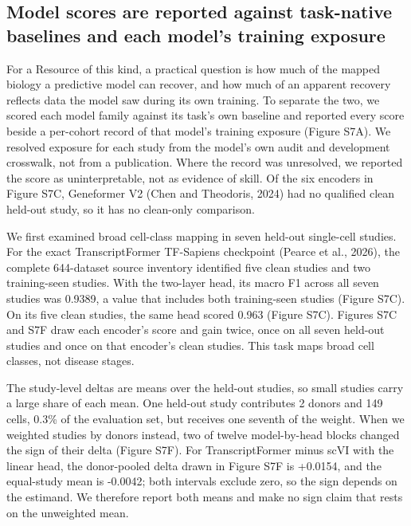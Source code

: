 \subsection{Model scores are reported against task-native baselines and each model's training exposure}\label{model-scores-are-reported-against-task-native-baselines-and-each-models-training-exposure}

For a Resource of this kind, a practical question is how much of the mapped
biology a predictive model can recover, and how much of an apparent recovery
reflects data the model saw during its own training. To separate the two, we
scored each model family against its task's own baseline and reported every
score beside a per-cohort record of that model's training exposure (Figure S7A).
We resolved exposure for each study from the model's own audit and development
crosswalk, not from a publication. Where the record was unresolved, we reported
the score as uninterpretable, not as evidence of skill. Of the six
encoders in Figure S7C, Geneformer V2 (Chen and Theodoris, 2024) had no qualified
clean held-out study, so it has no clean-only comparison.

We first examined broad cell-class mapping in seven held-out single-cell
studies. For the exact TranscriptFormer TF-Sapiens checkpoint (Pearce et al., 2026), the complete 644-dataset source inventory
identified five clean studies and two training-seen studies. With the two-layer
head, its macro F1 across all seven studies was 0.9389, a value that includes
both training-seen studies (Figure S7C). On its five clean studies, the same head
scored 0.963 (Figure S7C). Figures S7C and S7F draw each encoder's score and gain
twice, once on all seven held-out studies and once on that encoder's clean
studies. This task maps broad cell classes, not disease stages.



The study-level deltas are means over the held-out studies, so small studies
carry a large share of each mean. One held-out study contributes 2 donors and
149 cells, 0.3\% of the evaluation set, but receives one seventh of the weight.
When we weighted studies by donors instead, two of twelve model-by-head blocks
changed the sign of their delta (Figure S7F). For TranscriptFormer minus scVI
with the linear head, the donor-pooled delta drawn in Figure S7F is +0.0154,
and the equal-study mean is -0.0042; both intervals exclude zero, so the sign
depends on the estimand. We therefore report both means and
make no sign claim that rests on the unweighted mean.

